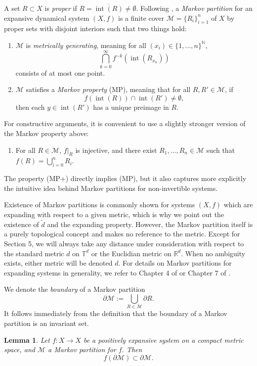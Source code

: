 \documentclass{article}
\def\N{\mathbb{N}}
\def\R{\mathbb{R}}
\def\T{\mathbb{T}}
\def\M{\mathcal{M}}
\newtheorem{lemma}[theorem]{Lemma}
\begin{document}
A set $R\subset X$ is \textit{proper} if $R=\overline{\operatorname{int}(R)}\neq \emptyset$. Following \cite{AKS}, a \textit{Markov partition} for an expansive dynamical system $(X,f)$ is a finite cover $\M=\{R_i\}_{i=1}^n$ of $X$ by proper sets with disjoint interiors such that two things hold: \begin{enumerate}
    \item $\M$ is \textit{metrically generating}, meaning for all $(x_i)\in \{1,...,n\}^\N$, $$\bigcap_{k=0}^\infty f^{-k}(\operatorname{int}(R_{x_n}))$$ consists of at most one point. 
    \item $\M$ satisfies a \textit{Markov property} (MP), meaning that for all $R,R'\in \M$, if $$f(\operatorname{int}(R))\cap \operatorname{int} (R')\neq \emptyset,$$ then each $y\in \operatorname{int} (R')$ has a unique preimage in $R$. 
\end{enumerate}

For constructive arguments, it is convenient to use a slightly stronger version of the Markov property above: 

\begin{enumerate}[(MP+)]
    \item For all $R\in \M$, $f|_R$ is injective, and there exist $R_1,...,R_n\in \M$ such that $f(R)=\bigcup_{i=0}^nR_i$.
\end{enumerate} The property (MP+) directly implies (MP), but it also captures more explicitly the intuitive idea behind Markov partitions for non-invertible systems. 

Existence of Markov partitions is commonly shown for systems $(X,f)$ which are expanding with respect to a given metric, which is why we point out the existence of $\tilde d$ and the expanding property. However, the Markov partition itself is a purely topological concept and makes no reference to the metric. Except for Section 5, we will always take any distance under consideration with respect to the standard metric $d$ on $\T^d$ or the Euclidian metric on $\R^d$. When no ambiguity exists, either metric will be denoted $d$. For details on Markov partitions for expanding systems in generality, we refer to Chapter 4 of \cite{URM} or Chapter 7 of \cite{Ru}. 



We denote the \textit{boundary} of a Markov partition $$\partial\M:=\bigcup_{R\in \M} \partial R.$$ It follows immediately from the definition that the boundary of a Markov partition is an invariant set.

\begin{lemma}\label{lem:boundaries are invariant}
    Let $f:X\to X$ be a positively expansive system on a compact metric space, and $\M$ a Markov partition for $f$. Then $$f(\partial\M)\subset \partial\M.$$
\end{lemma}
\end{document}
